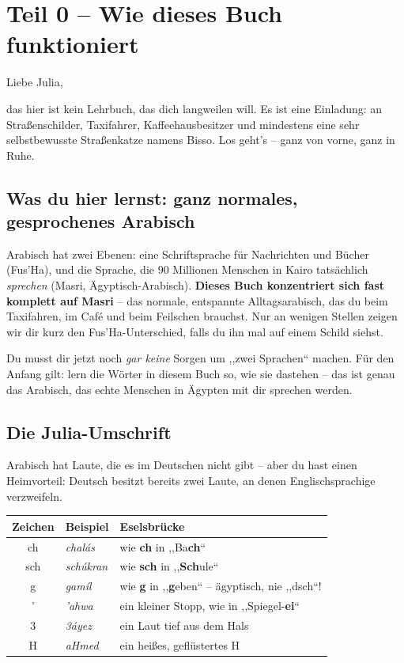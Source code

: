 
\chapter*{Teil 0 -- Wie dieses Buch funktioniert}

Liebe Julia,

das hier ist kein Lehrbuch, das dich langweilen will. Es ist eine Einladung:
an Straßenschilder, Taxifahrer, Kaffeehausbesitzer und mindestens eine sehr
selbstbewusste Straßenkatze namens Bisso. Los geht's -- ganz von vorne, ganz
in Ruhe.

\section*{Was du hier lernst: ganz normales, gesprochenes Arabisch}

Arabisch hat zwei Ebenen: eine Schriftsprache für Nachrichten und Bücher
(Fus'Ha), und die Sprache, die 90 Millionen Menschen in Kairo tatsächlich
\emph{sprechen} (Masri, Ägyptisch-Arabisch). \textbf{Dieses Buch
konzentriert sich fast komplett auf Masri} -- das normale, entspannte
Alltagsarabisch, das du beim Taxifahren, im Café und beim Feilschen
brauchst. Nur an wenigen Stellen zeigen wir dir kurz den Fus'Ha-Unterschied,
falls du ihn mal auf einem Schild siehst.

\begin{tippbox}
Du musst dir jetzt noch \emph{gar keine} Sorgen um ,,zwei Sprachen`` machen.
Für den Anfang gilt: lern die Wörter in diesem Buch so, wie sie dastehen --
das ist genau das Arabisch, das echte Menschen in Ägypten mit dir sprechen
werden.
\end{tippbox}

\section*{Die Julia-Umschrift}

Arabisch hat Laute, die es im Deutschen nicht gibt -- aber du hast einen
Heimvorteil: Deutsch besitzt bereits zwei Laute, an denen Englischsprachige verzweifeln.

\begin{center}
\renewcommand{\arraystretch}{1.4}
\begin{tabular}{cll}
\textbf{Zeichen} & \textbf{Beispiel} & \textbf{Eselsbrücke} \\
\hline
ch & \textit{chal\'as} & wie \textbf{ch} in ,,Ba\textbf{ch}`` \\
sch & \textit{sch\'ukran} & wie \textbf{sch} in ,,\textbf{Sch}ule`` \\
g & \textit{gam\'il} & wie \textbf{g} in ,,\textbf{g}eben`` -- ägyptisch, nie ,,dsch``! \\
' & \textit{'ahwa} & ein kleiner Stopp, wie in ,,Spiegel-\textbf{ei}`` \\
3 & \textit{3\'ayez} & ein Laut tief aus dem Hals \\
H & \textit{aHmed} & ein heißes, geflüstertes H \\
\end{tabular}
\end{center}


